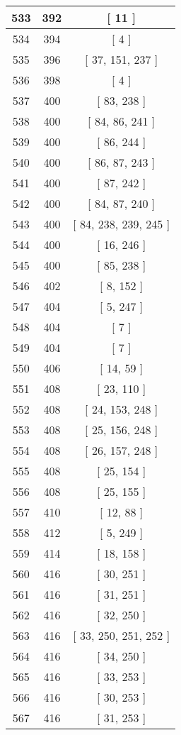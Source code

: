 \begin{center}
\begin{longtable}[H]{|| c c c ||}
\hline
533 & 392 & [ 11 ] \\ 
\hline
534 & 394 & [ 4 ] \\ 
\hline
535 & 396 & [ 37, 151, 237 ] \\ 
\hline
536 & 398 & [ 4 ] \\ 
\hline
537 & 400 & [ 83, 238 ] \\ 
\hline
538 & 400 & [ 84, 86, 241 ] \\ 
\hline
539 & 400 & [ 86, 244 ] \\ 
\hline
540 & 400 & [ 86, 87, 243 ] \\ 
\hline
541 & 400 & [ 87, 242 ] \\ 
\hline
542 & 400 & [ 84, 87, 240 ] \\ 
\hline
543 & 400 & [ 84, 238, 239, 245 ] \\ 
\hline
544 & 400 & [ 16, 246 ] \\ 
\hline
545 & 400 & [ 85, 238 ] \\ 
\hline
546 & 402 & [ 8, 152 ] \\ 
\hline
547 & 404 & [ 5, 247 ] \\ 
\hline
548 & 404 & [ 7 ] \\ 
\hline
549 & 404 & [ 7 ] \\ 
\hline
550 & 406 & [ 14, 59 ] \\ 
\hline
551 & 408 & [ 23, 110 ] \\ 
\hline
552 & 408 & [ 24, 153, 248 ] \\ 
\hline
553 & 408 & [ 25, 156, 248 ] \\ 
\hline
554 & 408 & [ 26, 157, 248 ] \\ 
\hline
555 & 408 & [ 25, 154 ] \\ 
\hline
556 & 408 & [ 25, 155 ] \\ 
\hline
557 & 410 & [ 12, 88 ] \\ 
\hline
558 & 412 & [ 5, 249 ] \\ 
\hline
559 & 414 & [ 18, 158 ] \\ 
\hline
560 & 416 & [ 30, 251 ] \\ 
\hline
561 & 416 & [ 31, 251 ] \\ 
\hline
562 & 416 & [ 32, 250 ] \\ 
\hline
563 & 416 & [ 33, 250, 251, 252 ] \\ 
\hline
564 & 416 & [ 34, 250 ] \\ 
\hline
565 & 416 & [ 33, 253 ] \\ 
\hline
566 & 416 & [ 30, 253 ] \\ 
\hline
567 & 416 & [ 31, 253 ] \\ 

\end{longtable}
\end{center}
